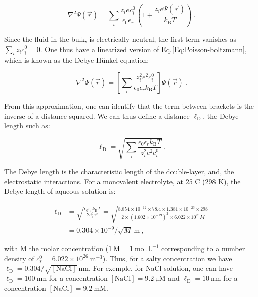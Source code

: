 \begin{equation}
	\nabla ^2 \Psi (\vec{r}) = \sum_i \frac{z_i e c_i^0}{\epsilon_0 \epsilon_r}  \left( 1 + \frac{z_i e \Psi (\vec{r})}{k_\mathrm{B}T} \right) ~.
\end{equation}

Since the fluid in the bulk, is electrically neutral, the first term vanishes as $\sum_i z_i c_i^0 = 0$. One thus have a linearized version of Eq.\ref{Eq:Poisson-boltzmann}, which is known as the Debye-Hünkel equation:

\begin{equation}
	\nabla^2 \Psi (\vec{r}) = \left[  \sum_i \frac{z_i ^2 e^2 c_i^0}{\epsilon_0 \epsilon_r  k_\mathrm{B} T}    \right] \Psi (\vec{r}) ~.
\end{equation}

From this approximation, one can identify that the term between brackets is the inverse of a distance squared. We can thus define a distance $\ell _\mathrm{D}$, the Debye length such as:

\begin{equation}
	\ell _\mathrm{D} =  \sqrt{ \sum_i\frac {\epsilon_0 \epsilon_r k_\mathrm{B} T} {z_i ^2 e^2 c_i^0}} ~.
\end{equation}

The Debye length is the characteristic length of the double-layer, and, the electrostatic interactions. For a monovalent electrolyte,  at 25 \textdegree C (298 K), the Debye length of aqueous solution is:

\begin{equation}
	\begin{aligned}
		\ell _\mathrm{D} &= \sqrt{\frac{\epsilon_0 \epsilon_r k_\mathrm{B}T}{2c_s^0 e^2}}
		= \sqrt{\frac{8.854 \times 10^{-12} \times 78.4 \times 1.381 \times 10^{-23}  \times 298}{2 \times (1.602 \times 10^{-19})^2 \times 6.022 \times 10^{26} M}} \\
		& = 0.304 \times 10^{-9} / \sqrt{M} ~ \mathrm{m} ~,
	\end{aligned}
\end{equation}


with M the molar concentration ($1 ~ \mathrm{M} = 1 ~ \mathrm{mol.L^{-1}} $ corresponding to a number density of $c_s^0 = 6.022 \times 10 ^{26} ~ \mathrm{ m^{-3}}$). Thus, for a salty concentration we have
 $\ell_\mathrm{D} = 0.304/ \sqrt{[\mathrm{NaCl}]} ~ \mathrm{nm}$. For exemple, for NaCl solution, one can have $\ell_\mathrm{D} = 100 ~ \mathrm{nm}$ for a concentration  $[\mathrm{NaCl}] = 9.2 ~ \mathrm{\mu M}$ and   $\ell_\mathrm{D} = 10 ~  \mathrm{nm}$ for a concentration  $[\mathrm{NaCl}] = 9.2 ~ \mathrm{mM}$.



